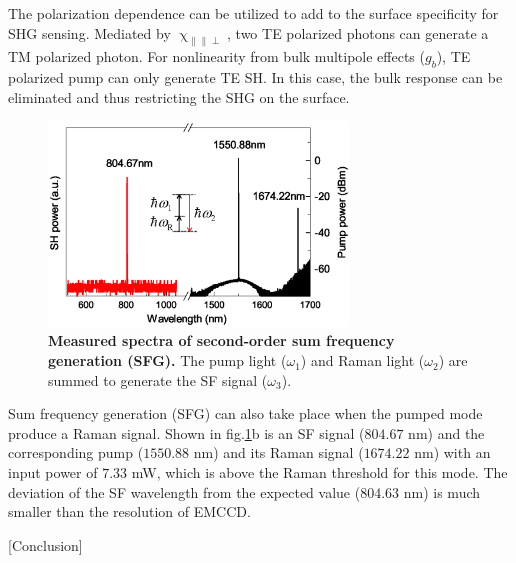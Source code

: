 \documentclass[a4paper,8pt,hyperref, twocolumn]{article}
\begin{document}
The polarization dependence can be utilized to add to the surface specificity for SHG sensing. Mediated by $\upchi_{\parallel \parallel \perp}$, two TE polarized photons can generate a TM polarized photon. For nonlinearity from bulk multipole effects ($g_b$), TE polarized pump can only generate TE SH. In this case, the bulk response can be eliminated and thus restricting the SHG on the surface.



\begin{figure}[!ht]
\centering
\includegraphics[width=8cm]{Fig4.eps}
\caption{\textbf{Measured spectra of second-order sum frequency generation (SFG). }The pump light ($\omega_1$) and Raman light ($\omega_2$) are summed to generate the SF signal ($\omega_3$).}
\label{pic:Fig4}
\end{figure}



Sum frequency generation (SFG) can also take place when the pumped mode produce a Raman signal. 
Shown in fig.\ref{pic:Fig4}b is an SF signal ($804.67$ nm) and the corresponding pump ($1550.88$ nm) and its Raman signal ($1674.22$ nm) with an input power of $7.33$ mW, which is above the Raman threshold for this mode. The deviation of the SF wavelength from the expected value ($804.63$ nm) is much smaller than the resolution of EMCCD.

[Conclusion]





\end{document}

